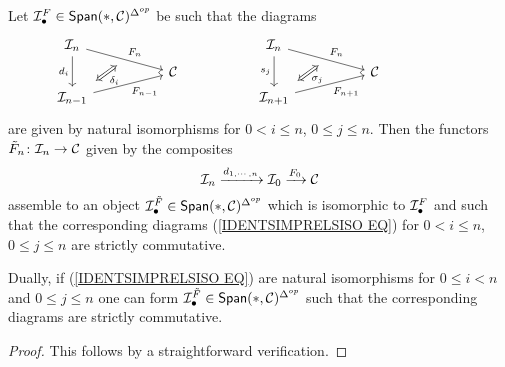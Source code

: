 \documentclass[a4paper,10pt]{article}%
\begin{document}
\begin{lemma}\label{TWISTING LEMMA}
	Let $\mcI_{\bullet}^F \in \mathsf{Span}(\**,\C)^{\Delta^{op}}$ be such that the diagrams
	\begin{equation}\label{IDENTSIMPRELSISO EQ}
	\begin{tikzcd}[row sep=0.4em,column sep = 5em]
		\mathcal{I}_n
		\ar{dr}[name=F1]{F_n} \ar{dd}[swap]{d_i} & &
		\mathcal{I}_n
		\ar{dr}[name=F2]{F_n} \ar{dd}[swap]{s_j} & &
	\\
 & \C & & \C &
	\\
|[alias=G2]| \mathcal{I}_{n-1}  \ar{ur}[swap]{F_{n-1}} & & 
|[alias=G3]| \mathcal{I}_{n+1}  \ar{ur}[swap]{F_{n+1}} & &
		\arrow[Leftrightarrow, from=F1, to=G2,shorten >=0.25cm,shorten <=0.25cm,"\delta_{i}"]
		\arrow[Leftrightarrow, from=F2, to=G3,shorten >=0.25cm,shorten <=0.25cm,"\sigma_{j}"]
	\end{tikzcd}
\end{equation}
are given by natural isomorphisms for $0 < i \leq n$, $0 \leq j \leq n$.
Then the functors $\tilde{F}_n \colon \mathcal{I}_n \to \mathcal{C}$ given by the composites
\[
\mathcal{I}_n \xrightarrow{d_{1,\cdots,n}} 
\mathcal{I}_0 \xrightarrow{F_0}
\mathcal{C}
\]
assemble to an object 
$\mcI_{\bullet}^{\tilde{F}} \in \mathsf{Span}(\**,\C)^{\Delta^{op}}$ which is isomorphic to $\mathcal{I}_{\bullet}^F$ and such that the corresponding diagrams (\ref{IDENTSIMPRELSISO EQ}) for $0 < i \leq n$, $0 \leq j \leq n$ are strictly commutative.

Dually, if (\ref{IDENTSIMPRELSISO EQ})
are natural isomorphisms for
$0\leq i <n$ and $0\leq j \leq n$
one can form 
$\mcI_{\bullet}^{\tilde{F}} \in \mathsf{Span}(\**,\C)^{\Delta^{op}}$ 
such that the corresponding diagrams are strictly commutative.
\end{lemma}


\begin{proof}
This follows by a straightforward verification.
\end{proof}
\end{document}
